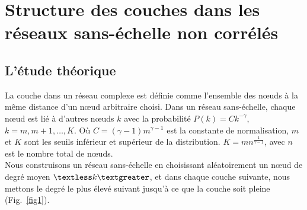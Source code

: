\section{Structure des couches dans les réseaux sans-échelle non corrélés}
        \subsection{L'étude théorique}
La couche dans un réseau complexe est définie comme l'ensemble des nœuds à la même distance d'un nœud arbitraire choisi. Dans un réseau sans-échelle, chaque nœud est lié à d'autres nœuds $k$ avec la probabilité $P(k)=Ck^{-\gamma}$, $k=m, m + 1, \ldots, K$. Où $C=(\gamma-1)m^{\gamma-1}$ est la constante de normalisation, $m$ et $K$ sont les seuils inférieur et supérieur de la distribution. $K=mn^{\frac{1}{\gamma-1}}$, avec $n$ est le nombre total de nœuds. \\
Nous construisons un réseau sans-échelle en choisissant aléatoirement un nœud de degré moyen $\km$, et dans chaque couche suivante, nous mettons le degré le plus élevé suivant jusqu'à ce que la couche soit pleine (Fig.~\ref{fig1}).\\
